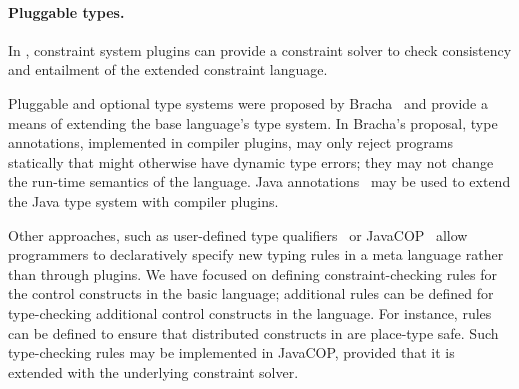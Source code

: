 \paragraph{Pluggable types.}

In \Xten{}, constraint system plugins can provide a constraint
solver to check consistency and entailment of the extended
constraint language.

Pluggable and optional type systems were proposed by
Bracha~\cite{bracha04-pluggable} and provide a means of
extending the base language's type system.
In Bracha's proposal, type annotations, implemented in compiler plugins,
may only reject programs statically that might otherwise have dynamic
type errors; they may not change the run-time semantics of the
language.
Java annotations~\cite{Java3,jsr308}
may be used to extend the Java type system with compiler plugins.

Other approaches, such as user-defined type
qualifiers~\cite{foster-popl02,chin05-qualifiers}
or JavaCOP~\cite{javacop-oopsla06}
allow programmers to 
declaratively specify new typing rules in a meta language rather
than through plugins.
We have focused on defining
constraint-checking rules for the control constructs in the basic language;
additional rules can be defined for type-checking additional control constructs
in the language.  For instance, rules can be defined to ensure that distributed constructs in \Xten{} are place-type safe.
Such type-checking rules may be
implemented in JavaCOP, provided that it is extended with the underlying
constraint solver.



